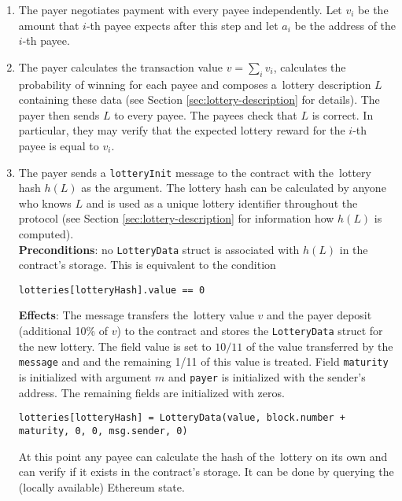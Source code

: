 \documentclass[a4paper]{article}
\begin{document}
    \begin{enumerate}
        \item The payer negotiates payment with every payee independently. Let $v_i$ be the amount that $i$-th payee
            expects after this step and let $a_i$ be the address of the $i$-th payee.
        \item The payer calculates the transaction value $v = \sum_i v_i$, calculates the probability of winning
            for each payee and composes a~lottery description $L$ containing these data (see Section
            \ref{sec:lottery-description} for details). The payer then sends $L$ to every payee. The payees check that $L$
            is correct. In particular, they may verify that the expected lottery reward for the $i$-th payee is equal
            to $v_i$.
        \item The payer sends a \texttt{lotteryInit} message to the contract with the~lottery hash $h(L)$ as the
            argument. The lottery hash can be calculated by anyone who knows $L$ and is used as a unique lottery
            identifier throughout the protocol (see Section \ref{sec:lottery-description} for information how $h(L)$ is
            computed).\\
            \textbf{Preconditions}: no \texttt{LotteryData} struct is associated with $h(L)$ in the contract's
            storage. This is equivalent to the condition
            \begin{center}
	            \texttt{lotteries[lotteryHash].value == 0}
	        \end{center}
            \textbf{Effects}: The message transfers the~lottery value $v$ and the payer deposit (additional 10\%
            of $v$) to the contract and stores the \texttt{LotteryData} struct for the new lottery. The field value
            is set to $10/11$ of the value transferred by the \texttt{message} and and the remaining 1/11 of this value
            is treated. Field \texttt{maturity} is initialized with argument $m$ and \texttt{payer} is initialized with
            the sender's address. The remaining fields are initialized with zeros.
            \begin{center}
            \texttt{lotteries[lotteryHash] = LotteryData(value, block.number + maturity, 0, 0, msg.sender, 0)}
            \end{center}
            At this point any payee can calculate the hash of the~lottery on its own and can verify if it exists in
            the contract's storage. It can be done by querying the (locally available) Ethereum state.

\end{enumerate}
\end{document}
